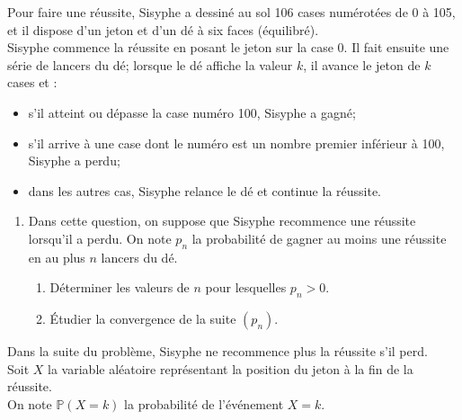 \documentclass[landscape,twocolumn,leqno,a4paper,10pt]{report} %
\newcommand\n{\noindent}
\newcommand{\Prob}{\mathbb{P}}
\begin{document}
\n Pour faire une réussite, Sisyphe a dessiné au sol 106 cases numérotées de 0 à 105, et il dispose d'un jeton et d'un dé à six faces (équilibré).\\
Sisyphe commence la réussite en posant le jeton sur la case $0$. Il fait ensuite une série de lancers du dé; lorsque le dé affiche la valeur $k$, il avance le jeton de $k$ cases et :
\begin{itemize}
	\item s'il atteint ou dépasse la case numéro 100, Sisyphe a gagné;
	\item s'il arrive à une case dont le numéro est un nombre premier inférieur à 100, Sisyphe a perdu;
	\item dans les autres cas, Sisyphe relance le dé et continue la réussite.
\end{itemize}


\begin{enumerate}
	\item Dans cette question, on suppose que Sisyphe recommence une réussite lorsqu'il a perdu. On note $p_{n}$ la probabilité de gagner au moins une réussite en au plus $n$ lancers du dé.
	\begin{enumerate}
		\item Déterminer les valeurs de $n$ pour lesquelles $p_{n}>0$.
		\item Étudier la convergence de la suite $\left(p_{n}\right)$.
	\end{enumerate}
\end{enumerate}

\n Dans la suite du problème, Sisyphe ne recommence plus la réussite s'il perd.\\ Soit $X$ la variable aléatoire représentant la position du jeton à la fin de la réussite.\\
On note $\Prob(X=k)$ la probabilité de l'événement $X=k$.
\end{document}
